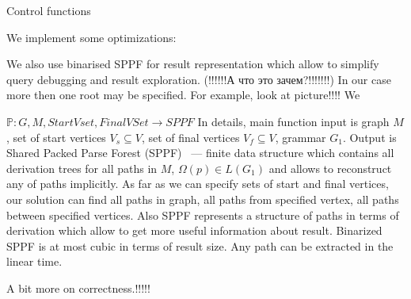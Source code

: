 \begin{algorithm}[h]
\begin{algorithmic}[1]
\caption{Control functions}
\label{mainFunctions}
       \Else 
       \EndIf
       \EndIf
  \EndCase
       \EndFor
  \EndCase
  \EndCase
  \Case{$\_$}
  \EndCase
  \EndSwitch
\EndFunction

\end{algorithmic}
\end{algorithm}



We implement some optimizations:~\cite{FastPracticalGLL}

We also use binarised SPPF for result representation which allow to simplify query debugging and result exploration. (!!!!!!А что это  зачем?!!!!!!!)
In our case more then one root may be specified. For example, look at picture!!!! 
We 

$\mathbb{P}:G, M, StartVset, FinalVSet \rightarrow SPPF$
In details, main function input is graph $M$, set of start vertices $V_s\subseteq V$, set of final vertices $V_f\subseteq V$, grammar $G_1$.
Output is Shared Packed Parse Forest (SPPF)~\cite{SPPF} --- finite data structure which contains all derivation trees for all paths in $M$, $\Omega(p) \in L(G_1)$ and allows to reconstruct any of paths implicitly.
As far as we can specify sets of start and final vertices, our solution can find all paths in graph, all paths from specified vertex, all paths between specified vertices. 
Also SPPF represents a structure of paths in terms of derivation which allow to get more useful 
information about result. 
Binarized SPPF is at most cubic in terms of result size. 
Any path can be extracted in the linear time.

A bit more on correctness.!!!!!
